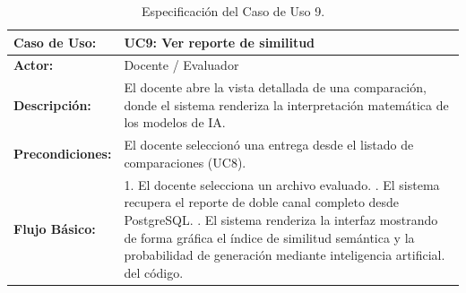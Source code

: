 \begin{table}[H]
	\centering
	\begin{tabular}{|p{3cm}|p{11cm}|}
		\hline
		\rowcolor[HTML]{E7F3FF}
		\textbf{Caso de Uso:}    & \textbf{UC9: Ver reporte de similitud}                                                                                                             \\ \hline
		\textbf{Actor:}          & Docente / Evaluador                                                                                                                                \\ \hline
		\textbf{Descripción:}    & El docente abre la vista detallada de una comparación, donde el sistema renderiza la interpretación matemática de los modelos de IA.               \\ \hline
		\textbf{Precondiciones:} & El docente seleccionó una entrega desde el listado de comparaciones (UC8).                                                                         \\ \hline
		\textbf{Flujo Básico:}   &
		1. El docente selecciona un archivo evaluado. \newline
		2. El sistema recupera el reporte de doble canal completo desde PostgreSQL. \newline
		3. El sistema renderiza la interfaz mostrando de forma gráfica el índice de similitud semántica y la probabilidad de generación mediante inteligencia artificial. del código. \\ \hline
	\end{tabular}
	\caption{Especificación del Caso de Uso 9.}
\end{table}


